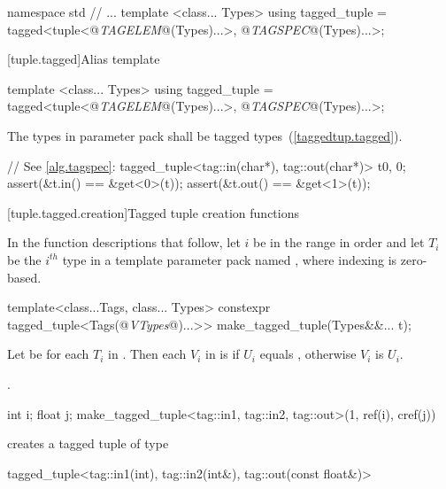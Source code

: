 
{\color{newclr}
\begin{codeblock}
namespace std {
  // ...
  template <class... Types>
  using tagged_tuple = tagged<tuple<@\textit{TAGELEM}@(Types)...>,
                              @\textit{TAGSPEC}@(Types)...>;
}
\end{codeblock}
}


\setcounter{subsection}{2}

{\color{newclr}
[tuple.tagged]{Alias template }

\begin{codeblock}
template <class... Types>
using tagged_tuple = tagged<tuple<@\textit{TAGELEM}@(Types)...>,
                            @\textit{TAGSPEC}@(Types)...>;
\end{codeblock}

\pnum The types in parameter pack  shall be tagged types~(\ref{taggedtup.tagged}).

\pnum \enterexample
\begin{codeblock}
// See \ref{alg.tagspec}:
tagged_tuple<tag::in(char*), tag::out(char*)> t{0, 0};
assert(&t.in() == &get<0>(t));
assert(&t.out() == &get<1>(t));
\end{codeblock}
\exitexample

[tuple.tagged.creation]{Tagged tuple creation functions}

\pnum
In the function descriptions that follow, let $i$ be in the range 
in order and let $T_i$ be the $i^{th}$ type in a template parameter pack named ,
where indexing is zero-based.

%
%
\begin{itemdecl}
template<class...Tags, class... Types>
  constexpr tagged_tuple<Tags(@\textit{VTypes}@)...>> make_tagged_tuple(Types&&... t);
\end{itemdecl}

\begin{itemdescr} \pnum Let  be  for each
$T_i$ in . Then each $V_i$ in  is
 if $U_i$ equals , otherwise
$V_i$ is $U_i$.

\pnum
\returns {}.

\pnum
\enterexample

\begin{codeblock}
int i; float j;
make_tagged_tuple<tag::in1, tag::in2, tag::out>(1, ref(i), cref(j))
\end{codeblock}

creates a tagged tuple of type

\begin{codeblock}
tagged_tuple<tag::in1(int), tag::in2(int&), tag::out(const float&)>
\end{codeblock}
\exitexample
\end{itemdescr}
}

